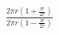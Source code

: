 \documentclass[preview]{standalone}
\begin{document}
\begin{center}
$\frac{2 \pi r (1+\frac{w}{2r})}{2 \pi r (1-\frac{w}{2r})}$
\end{center}
\end{document}

